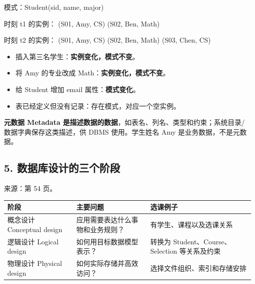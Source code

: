 \begin{StudyCode}
模式：Student(sid, name, major)

时刻 t1 的实例：
(S01, Amy, CS)
(S02, Ben, Math)

时刻 t2 的实例：
(S01, Amy, CS)
(S02, Ben, Math)
(S03, Chen, CS)
\end{StudyCode}

\begin{itemize}
\tightlist
\item
  插入第三名学生：\textbf{实例变化，模式不变}。
\item
  将 Amy 的专业改成 Math：\textbf{实例变化，模式不变}。
\item
  给 Student 增加 email 属性：\textbf{模式变化}。
\item
  表已经定义但没有记录：存在模式，对应一个空实例。
\end{itemize}

\textbf{元数据 Metadata 是描述数据的数据}，如表名、列名、类型和约束；系统目录/数据字典保存这类描述，供 DBMS 使用。学生姓名 Amy 是业务数据，不是元数据。

\subsection{5. 数据库设计的三个阶段}\label{01_database_fundamentals_zh-ux6570ux636eux5e93ux8bbeux8ba1ux7684ux4e09ux4e2aux9636ux6bb5}

来源：第 54 页。

\begin{longtable}[]{@{}
  >{\raggedright\arraybackslash}p{}
  >{\raggedright\arraybackslash}p{}
  >{\raggedright\arraybackslash}p{}@{}}
\toprule\noalign{}
\begin{minipage}[b]{\linewidth}\raggedright
阶段
\end{minipage} & \begin{minipage}[b]{\linewidth}\raggedright
主要问题
\end{minipage} & \begin{minipage}[b]{\linewidth}\raggedright
选课例子
\end{minipage} \\
\midrule\noalign{}
\endhead
\bottomrule\noalign{}
\endlastfoot
概念设计 Conceptual design & 应用需要表达什么事物和业务规则？ & 有学生、课程以及选课关系 \\
逻辑设计 Logical design & 如何用目标数据模型表示？ & 转换为 Student、Course、Selection 等关系及约束 \\
物理设计 Physical design & 如何实际存储并高效访问？ & 选择文件组织、索引和存储安排 \\
\end{longtable}

